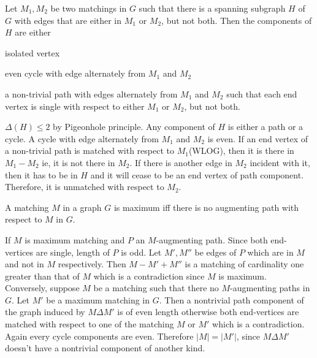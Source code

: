 \begin{theorem}
	Let $M_1,M_2$ be two matchings in $G$ such that there is a spanning subgraph $H$ of $G$ with edges that are either in $M_1$ or $M_2$, but not both.
Then the components of $H$ are either
\begin{enumerate*}
	\item isolated vertex
	\item even cycle with edge alternately from $M_1$ and $M_2$
	\item a non-trivial path with edges alternately from $M_1$ and $M_2$ such that each end vertex is single with respect to either $M_1$ or $M_2$, but not both.
\end{enumerate*}
\end{theorem}
\begin{synopsis}
	$\Delta(H) \le 2$ by Pigeonhole principle.
	Any component of $H$ is either a path or a cycle.
	A cycle with edge alternately from $M_1$ and $M_2$ is even.
	If an end vertex of a non-trivial path is matched with respect to $M_1$(WLOG), then it is there in $M_1-M_2$ ie, it is not there in $M_2$.
	If there is another edge in $M_2$ incident with it, then it has to be in $H$ and it will cease to be an end vertex of path component.
	Therefore, it is unmatched with respect to $M_2$.
\end{synopsis}

\begin{theorem}
	A matching $M$ in a graph $G$ is maximum iff there is no augmenting path with respect to $M$ in $G$.
\end{theorem}
\begin{synopsis}
	If $M$ is maximum matching and $P$ an $M$-augmenting path.
	Since both end-vertices are single, length of $P$ is odd.
	Let $M',M''$ be edges of $P$ which are in $M$ and not in $M$ respectively.
	Then $M - M' + M''$ is a matching of cardinality one greater than that of $M$ which is a contradiction since $M$ is maximum.\\


	Conversely, suppose $M$ be a matching such that there no $M$-augmenting paths in $G$.
	Let $M'$ be a maximum matching in $G$.
	Then a nontrivial path component of the graph induced by $M \Delta M'$ is of even length otherwise both end-vertices are matched with respect to one of the matching $M$ or $M'$ which is a contradiction.
	Again every cycle components are even.
	Therefore $|M| = |M'|$, since $M \Delta M'$ doesn't have a nontrivial component of another kind.
\end{synopsis}

